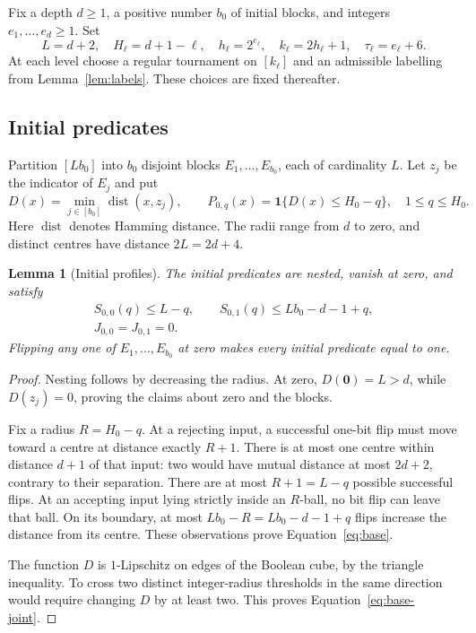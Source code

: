 \documentclass[11pt]{article}
\newtheorem{lemma}[theorem]{Lemma}
\theoremstyle{definition}
\theoremstyle{remark}
\DeclareMathOperator{\dist}{dist}
\newcommand{\zero}{\mathbf{0}}
\newcommand{\one}{\mathbf{1}}
\begin{document}
Fix a depth $d\ge1$, a positive number $b_0$ of initial blocks, and
integers $e_1,\ldots,e_d\ge1$.  Set
\[
 L=d+2,\quad H_\ell=d+1-\ell,\quad
 h_\ell=2^{e_\ell},\quad k_\ell=2h_\ell+1,\quad
 \tau_\ell=e_\ell+6.
\]
At each level choose a regular tournament on $[k_\ell]$ and an
admissible labelling from Lemma~\ref{lem:labels}.  These choices are
fixed thereafter.

\subsection{Initial predicates}

Partition $[Lb_0]$ into $b_0$ disjoint blocks $E_1,\ldots,E_{b_0}$,
each of cardinality $L$.  Let $z_j$ be the indicator of $E_j$ and put
\[
 D(x)=\min_{j\in[b_0]}\dist(x,z_j),\qquad
 P_{0,q}(x)=\one\{D(x)\le H_0-q\},\quad 1\le q\le H_0.
\]
Here $\dist$ denotes Hamming distance.  The radii range from $d$ to
zero, and distinct centres have distance $2L=2d+4$.

\begin{lemma}[Initial profiles]
\label{lem:base}
The initial predicates are nested, vanish at zero, and satisfy
\begin{gather}
 S_{0,0}(q)\le L-q,\qquad
 S_{0,1}(q)\le Lb_0-d-1+q,
 \label{eq:base}\\
 J_{0,0}=J_{0,1}=0.
 \label{eq:base-joint}
\end{gather}
Flipping any one of $E_1,\ldots,E_{b_0}$ at zero makes every
initial predicate equal to one.
\end{lemma}

\begin{proof}
Nesting follows by decreasing the radius.  At zero, $D(\zero)=L>d$,
while $D(z_j)=0$, proving the claims about zero and the blocks.

Fix a radius $R=H_0-q$.  At a rejecting input, a successful one-bit
flip must move toward a centre at distance exactly $R+1$.  There is at
most one centre within distance $d+1$ of that input: two would have
mutual distance at most $2d+2$, contrary to their separation.  There
are at most $R+1=L-q$ possible successful flips.  At an accepting
input lying strictly inside an $R$-ball, no bit flip can leave that
ball.  On its boundary, at most $Lb_0-R=Lb_0-d-1+q$ flips increase
the distance from its centre.  These observations prove
Equation~\eqref{eq:base}.

The function $D$ is $1$-Lipschitz on edges of the Boolean cube, by the
triangle inequality.  To cross two distinct integer-radius thresholds
in the same direction would require changing $D$ by at least two.
This proves Equation~\eqref{eq:base-joint}.
\end{proof}
\end{document}
